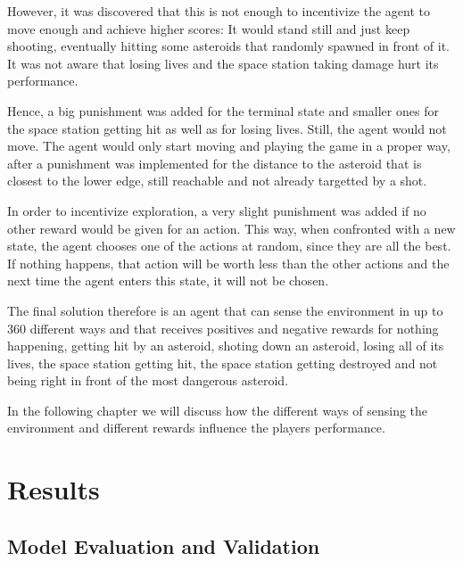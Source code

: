 \documentclass[a4paper,10pt]{article}
\begin{document}
However, it was discovered that this is not enough to incentivize the agent to move enough and achieve higher scores: It would stand still and just keep shooting, eventually hitting some asteroids that randomly spawned in front of it.
It was not aware that losing lives and the space station taking damage hurt its performance.

Hence, a big punishment was added for the terminal state and smaller ones for the space station getting hit as well as for losing lives.
Still, the agent would not move.
The agent would only start moving and playing the game in a proper way, after a punishment was implemented for the distance to the asteroid that is closest to the lower edge, still reachable and not already targetted by a shot.

In order to incentivize exploration, a very slight punishment was added if no other reward would be given for an action.
This way, when confronted with a new state, the agent chooses one of the actions at random, since they are all the best.
If nothing happens, that action will be worth less than the other actions and the next time the agent enters this state, it will not be chosen.

The final solution therefore is an agent that can sense the environment in up to $360$ different ways and that receives positives and negative rewards for nothing happening, getting hit by an asteroid, shoting down an asteroid, losing all of its lives, the space station getting hit, the space station getting destroyed and not being right in front of the most dangerous asteroid.

In the following chapter we will discuss how the different ways of sensing the environment and different rewards influence the players performance.
\section{Results}

\subsection{Model Evaluation and Validation}
\end{document}
